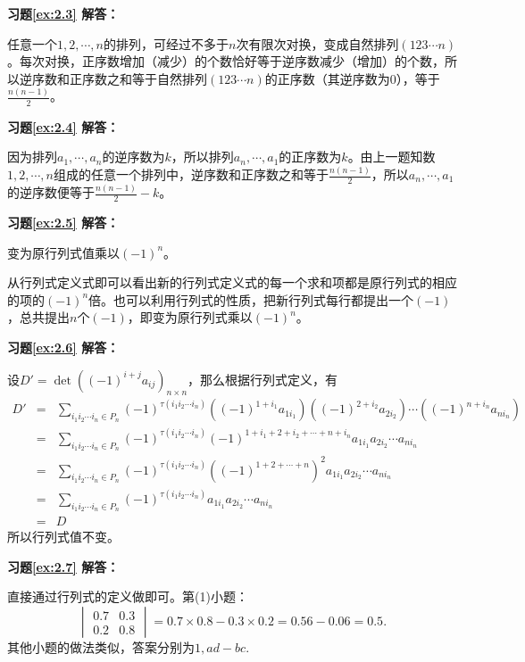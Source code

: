 \textbf{习题\ref{ex:2.3} 解答：}

任意一个$1,2,\cdots,n$的排列，可经过不多于$n$次有限次对换，变成自然排列$(123\cdots n)$。每次对换，正序数增加（减少）的个数恰好等于逆序数减少（增加）的个数，所以逆序数和正序数之和等于自然排列$(123\cdots n)$的正序数（其逆序数为0），等于$\frac{n(n-1)}{2}$。

\vspace{1.5em}

\textbf{习题\ref{ex:2.4} 解答：}

因为排列$a_1,\cdots,a_n$的逆序数为$k$，所以排列$a_n,\cdots,a_1$的正序数为$k$。由上一题知数$1,2,\cdots,n$组成的任意一个排列中，逆序数和正序数之和等于$\frac{n(n-1)}{2}$，所以$a_n,\cdots,a_1$ 的逆序数便等于$\frac{n(n-1)}{2}-k$。

\vspace{1.5em}

\textbf{习题\ref{ex:2.5} 解答：}

变为原行列式值乘以$(-1)^n$。

从行列式定义式即可以看出新的行列式定义式的每一个求和项都是原行列式的相应的项的$(-1)^n$倍。也可以利用行列式的性质，把新行列式每行都提出一个$(-1)$，总共提出$n$个$(-1)$，即变为原行列式乘以$(-1)^n$。

\vspace{1.5em}

\textbf{习题\ref{ex:2.6} 解答：}

设$D' = \det ((-1)^{i+j}a_{ij})_{n\times n}$，那么根据行列式定义，有
\begin{eqnarray*}
D' & = & \sum\limits_{i_1i_2\cdots i_n\in P_n} (-1)^{\tau(i_1i_2\cdots i_n)} ((-1)^{1+i_1}a_{1i_1}) ((-1)^{2+i_2}a_{2i_2}) \cdots ((-1)^{n+i_n}a_{ni_n}) \\
& = & \sum\limits_{i_1i_2\cdots i_n\in P_n} (-1)^{\tau(i_1i_2\cdots i_n)} (-1)^{1+i_1+2+i_2+\cdots+n+i_n} a_{1i_1} a_{2i_2} \cdots a_{ni_n} \\
& = & \sum\limits_{i_1i_2\cdots i_n\in P_n} (-1)^{\tau(i_1i_2\cdots i_n)} ((-1)^{1+2+\cdots+n})^2 a_{1i_1} a_{2i_2} \cdots a_{ni_n} \\
& = &  \sum\limits_{i_1i_2\cdots i_n\in P_n} (-1)^{\tau(i_1i_2\cdots i_n)} a_{1i_1} a_{2i_2} \cdots a_{ni_n} \\
& = & D
\end{eqnarray*}
所以行列式值不变。

\vspace{1.5em}

\textbf{习题\ref{ex:2.7} 解答：}

直接通过行列式的定义做即可。第(1)小题：
$$\begin{vmatrix} 0.7 & 0.3 \\ 0.2 & 0.8 \end{vmatrix} = 0.7\times 0.8 - 0.3\times 0.2 = 0.56 - 0.06 = 0.5.$$
其他小题的做法类似，答案分别为$1, ad-bc.$

